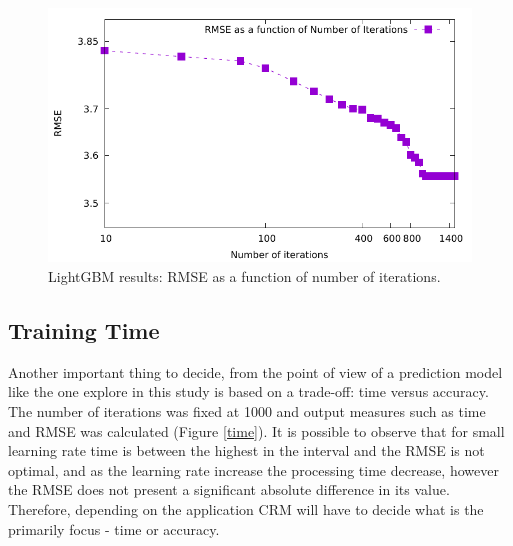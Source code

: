 \documentclass[letterpaper, 10 pt, conference]{ieeeconf}  %
\begin{document}
\begin{figure}[thpb]
\centering
\includegraphics[scale=0.7]{Figures/numinteractions_rmse_lgbm.pdf}
\caption{LightGBM results: RMSE as a function of number of iterations.}
\label{number_iterations}
\end{figure}


\subsection{Training Time}
Another important thing to decide, from the point of view of a prediction model like the one explore in this study is based on a trade-off: time versus accuracy. The number of iterations was fixed at 1000 and output measures such as time and RMSE was calculated (Figure \ref{time}). It is possible to observe that for small learning rate time is between the highest in the interval and the RMSE is not optimal, and as the learning rate increase the processing time decrease, however the RMSE does not present a significant absolute difference in its value. Therefore, depending on the application CRM will have to decide what is the primarily focus - time or accuracy.
\end{document}
